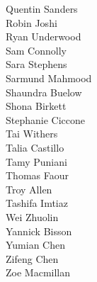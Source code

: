 \begin{multicols}{3}
\begin{center}
Quentin Sanders\\
\columnbreak
Robin Joshi\\
Ryan Underwood\\
Sam Connolly\\
Sara Stephens\\
Sarmund Mahmood\\
Shaundra Buelow\\
Shona Birkett\\
Stephanie Ciccone\\
Tai Withers\\
Talia Castillo\\
Tamy Puniani\\
Thomas Faour\\
Troy Allen\\
Tashifa Imtiaz\\
Wei Zhuolin\\
Yannick Bisson\\
Yumian Chen\\
Zifeng Chen\\
Zoe Macmillan
\end{center}
\end{multicols}
